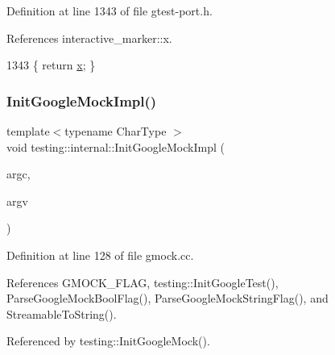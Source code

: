 Definition at line 1343 of file gtest-\/port.\+h.



References interactive\+\_\+marker\+::x.


\begin{DoxyCode}
1343 \{ \textcolor{keywordflow}{return} \hyperlink{namespaceinteractive__marker_acda52804aef30b460a72fb21ee01d69d}{x}; \}
\end{DoxyCode}
\mbox{\label{namespacetesting_1_1internal_a3823844199df88af9493026031cf7744}} 
\subsubsection{\texorpdfstring{Init\+Google\+Mock\+Impl()}{InitGoogleMockImpl()}}
{\footnotesize\ttfamily template$<$typename Char\+Type $>$ \\
void testing\+::internal\+::\+Init\+Google\+Mock\+Impl (\begin{DoxyParamCaption}\item[{int $\ast$}]{argc,  }\item[{Char\+Type $\ast$$\ast$}]{argv }\end{DoxyParamCaption})}



Definition at line 128 of file gmock.\+cc.



References G\+M\+O\+C\+K\+\_\+\+F\+L\+AG, testing\+::\+Init\+Google\+Test(), Parse\+Google\+Mock\+Bool\+Flag(), Parse\+Google\+Mock\+String\+Flag(), and Streamable\+To\+String().



Referenced by testing\+::\+Init\+Google\+Mock().


